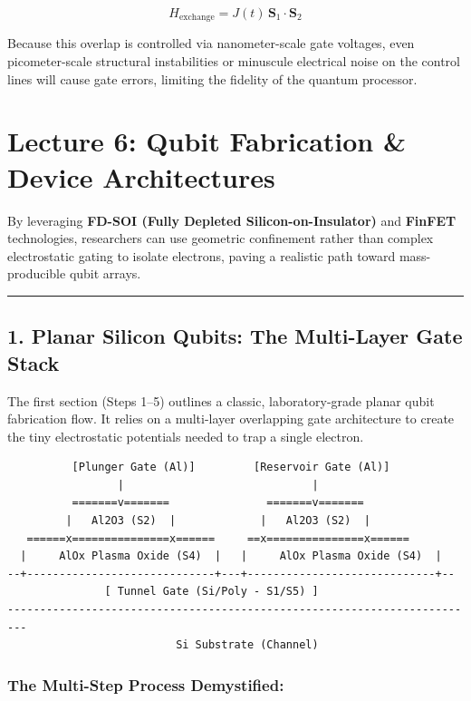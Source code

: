 \documentclass[
]{article}
\begin{document}
\[H_{\text{exchange}} = J(t) \, \mathbf{S}_1 \cdot \mathbf{S}_2\]

Because this overlap is controlled via nanometer-scale gate voltages,
even picometer-scale structural instabilities or minuscule electrical
noise on the control lines will cause gate errors, limiting the fidelity
of the quantum processor.

\section{Lecture 6: Qubit Fabrication \& Device
Architectures}\label{lecture-6-qubit-fabrication-device-architectures}

By leveraging \textbf{FD-SOI (Fully Depleted Silicon-on-Insulator)} and
\textbf{FinFET} technologies, researchers can use geometric confinement
rather than complex electrostatic gating to isolate electrons, paving a
realistic path toward mass-producible qubit arrays.

\begin{center}\rule{0.5\linewidth}{0.5pt}\end{center}

\subsection{1. Planar Silicon Qubits: The Multi-Layer Gate
Stack}\label{planar-silicon-qubits-the-multi-layer-gate-stack}

The first section (Steps 1--5) outlines a classic, laboratory-grade
planar qubit fabrication flow. It relies on a multi-layer overlapping
gate architecture to create the tiny electrostatic potentials needed to
trap a single electron.

\begin{verbatim}
          [Plunger Gate (Al)]         [Reservoir Gate (Al)]
                 |                             |
          =======v=======               =======v=======
         |   Al2O3 (S2)  |             |   Al2O3 (S2)  |
   ======x===============x======     ==x===============x======
  |     AlOx Plasma Oxide (S4)  |   |     AlOx Plasma Oxide (S4)  |
--+-----------------------------+---+-----------------------------+--
               [ Tunnel Gate (Si/Poly - S1/S5) ]
-------------------------------------------------------------------------
                          Si Substrate (Channel)
\end{verbatim}

\subsubsection{The Multi-Step Process
Demystified:}\label{the-multi-step-process-demystified}
\end{document}
